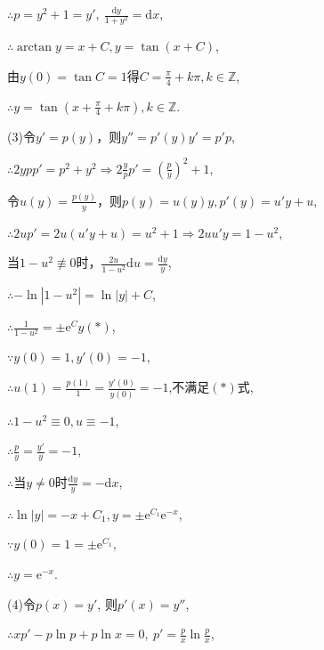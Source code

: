 \documentclass[12pt,UTF8,fleqn]{ctexart}
\newcommand{\md}[1]{\mathrm d#1}
\newcommand{\me}[0]{\mathrm e}
\begin{document}
\begin{enumerate}
$\therefore p=y^2+1=y',\ \frac{\md y}{1+y^2}=\md x$,

$\therefore\arctan y=x+C, y=\tan(x+C)$,

由$y(0)=\tan C=1$得$C=\frac\pi4+k\pi,k\in\mathbb Z$,

$\therefore y=\tan(x+\frac\pi4+k\pi),k\in\mathbb Z$.

(3)令$y'=p(y)$，则$y''=p'(y)y'=p'p$,

$\therefore 2ypp'=p^2+y^2\Rightarrow 2\frac ypp'=(\frac py)^2+1$,

令$u(y)=\frac{p(y)}y$，则$p(y)=u(y)y,p'(y)=u'y+u$,

$\therefore2up'=2u(u'y+u)=u^2+1\Rightarrow 2uu'y=1-u^2$,

当$1-u^2\not\equiv0$时，$\frac{2u}{1-u^2}\mathrm du=\frac{\md y}y$,

$\therefore-\ln|1-u^2|=\ln|y|+C$,

$\therefore\frac1{1-u^2}=\pm\me^Cy(*)$,

$\because y(0)=1,y'(0)=-1$,

$\therefore u(1)=\frac{p(1)}1=\frac{y'(0)}{y(0)}=-1$,不满足$(*)$式,

$\therefore1-u^2\equiv0,u\equiv-1$,

$\therefore\frac py=\frac{y'}y=-1$,

$\therefore$当$y\neq0$时$\frac{\md y}{y}=-\md x$,

$\therefore\ln|y|=-x+C_1,y=\pm\me^{C_1}\me^{-x}$,

$\because y(0)=1=\pm\me^{C_1}$,

$\therefore y=\me^{-x}$.

%
%
%
%
%
%
%
%
%
%
%
%
%
%
%
%
%
%

(4)令$p(x)=y'$, 则$p'(x)=y''$,

$\therefore xp'-p\ln p+p\ln x=0,\ p'=\frac px\ln\frac px$,


\end{enumerate}
\end{document}
